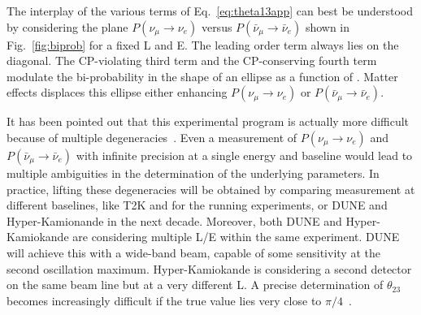 The interplay of the various terms of Eq.~\ref{eq:theta13app} can best be understood by considering the plane $ P (\nu_\mu \rightarrow \nu_e)$ versus  $ P (\bar{\nu}_\mu \rightarrow \bar{\nu}_e)$ shown in Fig.~\ref{fig:biprob} for a fixed L and E. The leading order term always lies on the diagonal. The CP-violating third term and the CP-conserving fourth term modulate the bi-probability in the shape of an ellipse as a function of \dcp.
Matter effects displaces this ellipse either enhancing $ P (\nu_\mu \rightarrow \nu_e)$ or 
$ P (\bar{\nu}_\mu \rightarrow \bar{\nu}_e)$.


It has been pointed out that this experimental program is actually more difficult because of multiple degeneracies~\cite{burguet,parkedeg}. Even a measurement of $ P (\nu_\mu \rightarrow \nu_e)$ and  $ P (\bar{\nu}_\mu \rightarrow \bar{\nu}_e)$ with infinite precision at a single energy and baseline would lead to multiple ambiguities in the determination of the underlying parameters. In practice, lifting these degeneracies will be obtained by comparing measurement at different baselines, like T2K and \nova for the running experiments, or DUNE and Hyper-Kamionande in the next decade. Moreover, both DUNE and Hyper-Kamiokande are considering multiple L/E within the same experiment. DUNE will achieve this with a wide-band beam, capable of some sensitivity at the second oscillation maximum. Hyper-Kamiokande is considering a second detector on the same beam line but at a very different L. A precise determination of $\theta_{23}$ becomes increasingly difficult if the true value lies very close to $\pi/4$~\cite{parkedeg}. 



